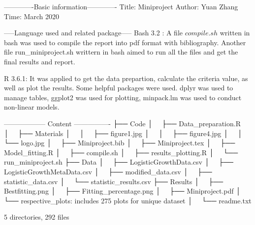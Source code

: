-------------Basic information-------------
Title: Miniproject
Author: Yuan Zhang
Time: March 2020


-----Language used and related package-----
Bash 3.2 : A file $compile.sh$ written in bash was used to compile the report into pdf format with bibliography. Another file run_miniproject.sh writtern in bash aimed to run all the files and get the final results and report.

R 3.6.1: It was applied to get the data prepartion, calculate the criteria value, as well as plot the results. Some helpful packages were used. 
dplyr was used to manage tables, 
ggplot2 was used for plotting, 
minpack.lm was used to conduct non-linear models. 


------------------ Content ----------------
├── Code
│   ├── Data_preparation.R
│   ├── Materials
│   │   ├── figure1.jpg
│   │   ├── figure4.jpg
│   │   └── logo.jpg
│   ├── Miniproject.bib
│   ├── Miniproject.tex
│   ├── Model_fitting.R
│   ├── compile.sh
│   ├── results_plotting.R
│   └── run_miniproject.sh
├── Data
│   ├── LogisticGrowthData.csv
│   ├── LogisticGrowthMetaData.csv
│   ├── modified_data.csv
│   ├── statistic_data.csv
│   └── statistic_results.csv
├── Results
│   ├── Bestfitting.png
│   ├── Fitting_percentage.png
│   ├── Miniproject.pdf
│   └── respective_plots: includes 275 plots for unique dataset
│       
└── readme.txt

5 directories, 292 files
